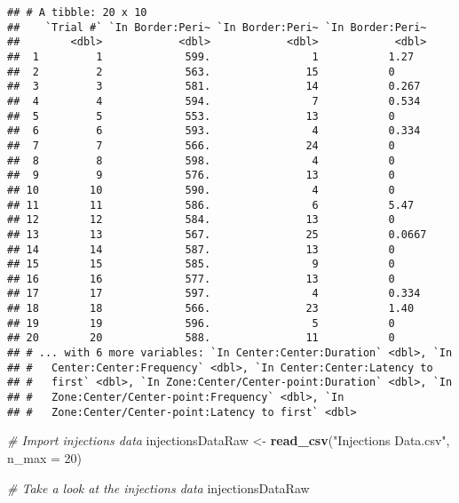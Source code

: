 \documentclass[]{article}
\newenvironment{Shaded}{\begin{snugshade}}{\end{snugshade}}
\newcommand{\KeywordTok}[1]{\textcolor[rgb]{0.13,0.29,0.53}{\textbf{#1}}}
\newcommand{\DataTypeTok}[1]{\textcolor[rgb]{0.13,0.29,0.53}{#1}}
\newcommand{\DecValTok}[1]{\textcolor[rgb]{0.00,0.00,0.81}{#1}}
\newcommand{\StringTok}[1]{\textcolor[rgb]{0.31,0.60,0.02}{#1}}
\newcommand{\CommentTok}[1]{\textcolor[rgb]{0.56,0.35,0.01}{\textit{#1}}}
\newcommand{\NormalTok}[1]{#1}
\begin{document}
\begin{verbatim}
## # A tibble: 20 x 10
##    `Trial #` `In Border:Peri~ `In Border:Peri~ `In Border:Peri~
##        <dbl>            <dbl>            <dbl>            <dbl>
##  1         1             599.                1           1.27  
##  2         2             563.               15           0     
##  3         3             581.               14           0.267 
##  4         4             594.                7           0.534 
##  5         5             553.               13           0     
##  6         6             593.                4           0.334 
##  7         7             566.               24           0     
##  8         8             598.                4           0     
##  9         9             576.               13           0     
## 10        10             590.                4           0     
## 11        11             586.                6           5.47  
## 12        12             584.               13           0     
## 13        13             567.               25           0.0667
## 14        14             587.               13           0     
## 15        15             585.                9           0     
## 16        16             577.               13           0     
## 17        17             597.                4           0.334 
## 18        18             566.               23           1.40  
## 19        19             596.                5           0     
## 20        20             588.               11           0     
## # ... with 6 more variables: `In Center:Center:Duration` <dbl>, `In
## #   Center:Center:Frequency` <dbl>, `In Center:Center:Latency to
## #   first` <dbl>, `In Zone:Center/Center-point:Duration` <dbl>, `In
## #   Zone:Center/Center-point:Frequency` <dbl>, `In
## #   Zone:Center/Center-point:Latency to first` <dbl>
\end{verbatim}

\begin{Shaded}
\begin{Highlighting}[]
\CommentTok{# Import injections data}
\NormalTok{injectionsDataRaw <-}\StringTok{ }\KeywordTok{read_csv}\NormalTok{(}\StringTok{"Injections Data.csv"}\NormalTok{, }\DataTypeTok{n_max =} \DecValTok{20}\NormalTok{)}

\CommentTok{# Take a look at the injections data}
\NormalTok{injectionsDataRaw}
\end{Highlighting}
\end{Shaded}
\end{document}
